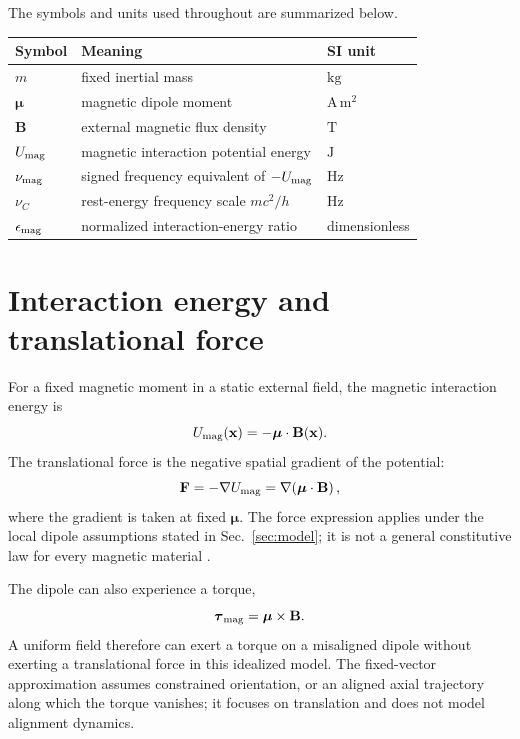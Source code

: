 \documentclass[12pt]{article}
\begin{document}
The symbols and units used throughout are summarized below.
\begin{center}
\small
\begin{tabular}{@{}lll@{}}
  \toprule
  Symbol & Meaning & SI unit \\
  \midrule
  $m$ & fixed inertial mass & $\mathrm{kg}$ \\
  $\boldsymbol{\mu}$ & magnetic dipole moment & $\mathrm{A\,m^2}$ \\
  $\mathbf B$ & external magnetic flux density & $\mathrm T$ \\
  $U_{\rm mag}$ & magnetic interaction potential energy & $\mathrm J$ \\
  $\nu_{\rm mag}$ & signed frequency equivalent of $-U_{\rm mag}$ & $\mathrm{Hz}$ \\
  $\nu_C$ & rest-energy frequency scale $mc^2/h$ & $\mathrm{Hz}$ \\
  $\epsilon_{\rm mag}$ & normalized interaction-energy ratio & dimensionless \\
  \bottomrule
\end{tabular}
\end{center}

\section{Interaction energy and translational force}
\label{sec:energy-force}

For a fixed magnetic moment in a static external field, the magnetic interaction energy is
\begin{equation}
  U_{\rm mag}(\mathbf x)
  =-\boldsymbol{\mu}\cdot\mathbf B(\mathbf x).
  \label{eq:dipole-energy}
\end{equation}
The translational force is the negative spatial gradient of the potential:
\begin{equation}
  \mathbf F=-\nabla U_{\rm mag}
  =\nabla\!\left(\boldsymbol{\mu}\cdot\mathbf B\right),
  \label{eq:dipole-force}
\end{equation}
where the gradient is taken at fixed $\boldsymbol{\mu}$. The force expression applies under the local dipole assumptions stated in Sec.~\ref{sec:model}; it is not a general constitutive law for every magnetic material \cite{TongDipole}.

The dipole can also experience a torque,
\begin{equation}
  \boldsymbol{\tau}_{\rm mag}
  =\boldsymbol{\mu}\times\mathbf B.
  \label{eq:dipole-torque}
\end{equation}
A uniform field therefore can exert a torque on a misaligned dipole without exerting a translational force in this idealized model. The fixed-vector approximation assumes constrained orientation, or an aligned axial trajectory along which the torque vanishes; it focuses on translation and does not model alignment dynamics.
\end{document}
